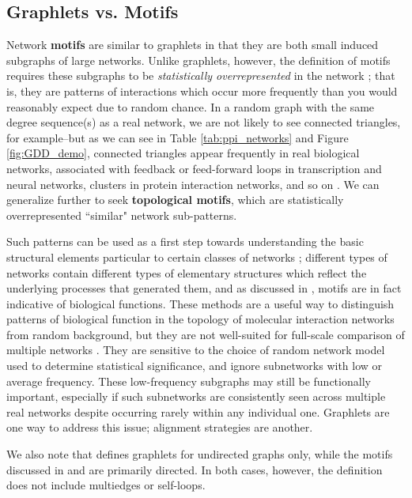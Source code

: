 \documentclass[12pt]{thesis}
\theoremstyle{plain}
\theoremstyle{definition}
\theoremstyle{remark}
\begin{document}
\subsection{Graphlets vs. Motifs}

Network \textbf{motifs} are similar to graphlets in that they are both small induced subgraphs of large networks. Unlike graphlets, however, the definition of motifs requires these subgraphs to be \textit{statistically overrepresented} in the network \cite{Milo_2002}; that is, they are patterns of interactions which occur more frequently than you would reasonably expect due to random chance. In a random graph with the same degree sequence(s) as a real network, we are not likely to see connected triangles, for example--but as we can see in Table \ref{tab:ppi_networks} and Figure \ref{fig:GDD_demo}, connected triangles appear frequently in real biological networks, associated with feedback or feed-forward loops in transcription and neural networks, clusters in protein interaction networks, and so on \cite{Berg_2004}. We can generalize further to seek \textbf{topological motifs}, which are statistically overrepresented ``similar" network sub-patterns. 

Such patterns can be used as a first step towards understanding the basic structural elements particular to certain classes of networks \cite{Milo_2002}; different types of networks contain different types of elementary structures which reflect the underlying processes that generated them, and as discussed in \cite{Berg_2004}, motifs are in fact indicative of biological functions. These methods are a useful way to distinguish patterns of biological function in the topology of molecular interaction networks from random background, but they are not well-suited for full-scale comparison of multiple networks \cite{Przulj_2007}. They are sensitive to the choice of random network model used to determine statistical significance, and ignore subnetworks with low or average frequency. These low-frequency subgraphs may still be functionally important, especially if such subnetworks are consistently seen across multiple real networks despite occurring rarely within any individual one. Graphlets are one way to address this issue; alignment strategies are another. 

We also note that \cite{Przulj_2007} defines graphlets for undirected graphs only, while the motifs discussed in \cite{Milo_2002} and \cite{Berg_2004} are primarily directed. In both cases, however, the definition does not include multiedges or self-loops.
\end{document}
